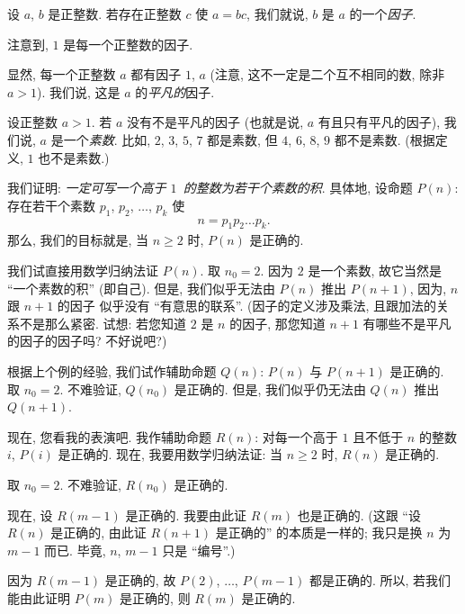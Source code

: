 \begin{example}
    设 \(a\), \(b\) 是正整数.
    若存在正整数 \(c\) 使 \(a = bc\),
    我们就说, \(b\) 是 \(a\) 的一个\emph{因子}.

    注意到, \(1\) 是每一个正整数的因子.

    显然, 每一个正整数 \(a\) 都有因子 \(1\), \(a\)
    (注意, 这不一定是二个互不相同的数, 除非 \(a > 1\)).
    我们说, 这是 \(a\) 的\emph{平凡的}因子.

    设正整数 \(a > 1\).
    若 \(a\) 没有不是平凡的因子
    (也就是说, \(a\) 有且只有平凡的因子),
    我们说, \(a\) 是一个\emph{素数}.
    比如, \(2\), \(3\), \(5\), \(7\) 都是素数,
    但 \(4\), \(6\), \(8\), \(9\) 都不是素数.
    (根据定义, \(1\) 也不是素数.)

    我们证明:
    \emph{一定可写一个高于 \(1\)~的整数为若干个素数的积}.
    具体地, 设命题 \(P(n)\):
    存在若干个素数
    \(p_1\), \(p_2\), \(\dots\), \(p_k\) 使
    \begin{align*}
        n = p_1 p_2 \dots p_k.
    \end{align*}
    那么, 我们的目标就是,
    当 \(n \geq 2\) 时,
    \(P(n)\) 是正确的.

    我们试直接用数学归纳法证 \(P(n)\).
    取 \(n_0 = 2\).
    因为 \(2\) 是一个素数,
    故它当然是 ``一个素数的积'' (即自己).
    但是, 我们似乎无法由
    \(P(n)\) 推出 \(P(n+1)\),
    因为, \(n\) 跟 \(n+1\) 的因子%
    似乎没有 ``有意思的联系''.
    (因子的定义涉及乘法, 且跟加法的关系不是那么紧密.
    试想: 若您知道 \(2\) 是 \(n\) 的因子,
    那您知道 \(n+1\) 有哪些不是平凡的因子的因子吗?
    不好说吧?)

    根据上个例的经验, 我们试作辅助命题 \(Q(n)\):
    \(P(n)\) 与 \(P(n+1)\) 是正确的.
    取 \(n_0 = 2\).
    不难验证, \(Q(n_0)\) 是正确的.
    但是, 我们似乎仍无法由
    \(Q(n)\) 推出 \(Q(n+1)\).

    现在, 您看我的表演吧.
    我作辅助命题 \(R(n)\):
    对每一个高于 \(1\) 且不低于 \(n\) 的整数 \(i\),
    \(P(i)\) 是正确的.
    现在, 我要用数学归纳法证:
    当 \(n \geq 2\) 时,
    \(R(n)\) 是正确的.

    取 \(n_0 = 2\).
    不难验证, \(R(n_0)\) 是正确的.

    现在, 设 \(R(m-1)\) 是正确的.
    我要由此证 \(R(m)\) 也是正确的.
    (这跟 ``设 \(R(n)\) 是正确的,
    由此证 \(R(n+1)\) 是正确的''
    的本质是一样的;
    我只是换 \(n\) 为 \(m-1\) 而已.
    毕竟, \(n\), \(m-1\) 只是 ``编号''.)

    因为 \(R(m-1)\) 是正确的,
    故 \(P(2)\), \(\dots\), \(P(m-1)\) 都是正确的.
    所以, 若我们能由此证明 \(P(m)\) 是正确的,
    则 \(R(m)\) 是正确的.


\end{example}
